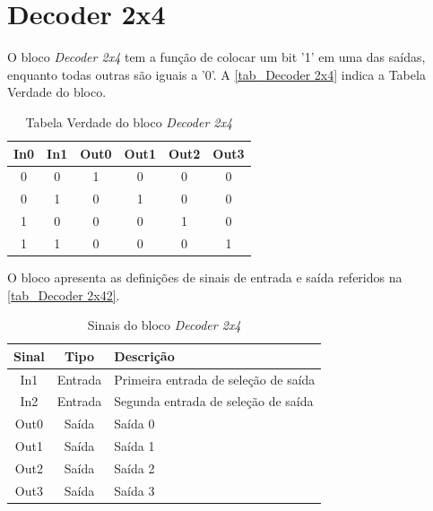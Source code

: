 \renewcommand{\NomeBloco}{\emph{Decoder 2x4}}
\renewcommand{\NomeBlocoNoIt}{Decoder 2x4}
\renewcommand{\NomePTab}{tab_\NomeBlocoNoIt}
\renewcommand{\NomeSTab}{tab_\NomeBlocoNoIt2}
\renewcommand{\NomePFig}{fig_\NomeBlocoNoIt}
\renewcommand{\NomeSFig}{fig_\NomeBlocoNoIt2}
\renewcommand{\NomeTTab}{tab_\NomeBlocoNoIt3}

\section{Decoder 2x4}

O bloco \NomeBloco{} tem a função de colocar um bit '1' em uma das sa\'idas, enquanto todas outras são iguais a '0'. A \autoref{\NomePTab} indica a Tabela Verdade do bloco.

\begin{table}[htbp]

\caption{Tabela Verdade do bloco \NomeBloco}%
\label{\NomePTab}
\centering
\begin{tabular}{cccccc}
    \toprule
    In0 & In1 & Out0 & Out1 & Out2 & Out3 \\
    \midrule \midrule
    0 & 0 & 1 & 0 & 0 & 0 \\
    \midrule
    0 & 1 & 0 & 1 & 0 & 0 \\
    \midrule
    1 & 0 & 0 & 0 & 1 & 0 \\
    \midrule
    1 & 1 & 0 & 0 & 0 & 1 \\
\bottomrule

\end{tabular}
\end{table}

O bloco apresenta as definições de sinais de entrada e sa\'ida referidos na \autoref{\NomeSTab}.

\begin{table}[htbp]
\caption{Sinais do bloco \NomeBloco}
\label{\NomeSTab}
\centering
\begin{tabular}{ccl}

    \toprule
    Sinal & Tipo    & Descrição        \\
    \midrule \midrule
    In1    & Entrada & Primeira entrada de seleção de sa\'ida \\
    \midrule
    In2    & Entrada & Segunda entrada de seleção de sa\'ida \\
    \midrule
    Out0 & Sa\'ida & Sa\'ida 0\\
    \midrule
    Out1 & Sa\'ida & Sa\'ida 1\\
    \midrule
    Out2 & Sa\'ida & Sa\'ida 2\\
    \midrule
    Out3 & Sa\'ida & Sa\'ida 3\\
    \bottomrule
\end{tabular}
\end{table}

